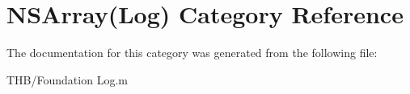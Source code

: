 \hypertarget{category_n_s_array_07_log_08}{}\section{N\+S\+Array(Log) Category Reference}
\label{category_n_s_array_07_log_08}


The documentation for this category was generated from the following file\+:\begin{DoxyCompactItemize}
\item 
T\+H\+B/Foundation Log.\+m\end{DoxyCompactItemize}
